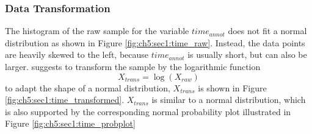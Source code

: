 \subsubsection{Data Transformation}

The histogram of the raw sample for the variable $time_{annot}$ does not fit a normal distribution as shown in Figure \ref{fig:ch5:sec1:time_raw}.
Instead, the data points are heavily skewed to the left, because $time_{annot}$ is usually short, but can also be larger.
\cite{PS16-Statistics} suggests to transform the sample by the logarithmic function 
\begin{equation} \label{equ:trans_time}
	X_{trans} = \log \left( X_{raw} \right) 
\end{equation}
to adapt the shape of a normal distribution, $X_{trans}$ is shown in Figure \ref{fig:ch5:sec1:time_transformed}.
$X_{trans}$ is similar to a normal distribution, which is also supported by the corresponding normal probability plot illustrated in Figure \ref{fig:ch5:sec1:time_probplot}

